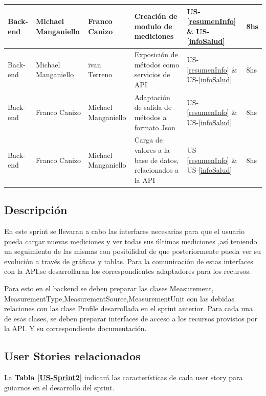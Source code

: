 {\begin{center}
{\begin{tabular}{|l|l|l|p{5cm}|l|p{1cm}|}
					Back-end& Michael Manganiello & Franco Canizo & Creación de modulo de mediciones&US-\ref{resumenInfo} \& US-\ref{infoSalud} &8hs\\ \hline
					Back-end& Michael Manganiello & ivan Terreno & Exposición de métodos como servicios de API 	& US-\ref{resumenInfo} \& US-\ref{infoSalud}&8hs\\ \hline
					Back-end& Franco Canizo & Michael Manganiello   & Adaptación de salida de métodos a formato Json&US-\ref{resumenInfo} \& US-\ref{infoSalud} &8hs\\ \hline
					Back-end & Franco Canizo & Michael Manganiello  & Carga de valores a la base de datos, relacionados a la API&US-\ref{resumenInfo} \& US-\ref{infoSalud} &8hs \\ \hline
				\end{tabular}
			}
		\end{center}
	}

    
\subsection{Descripción}
En este sprint se llevaran a cabo las interfaces necesarias para que el usuario pueda cargar nuevas mediciones y ver todas sus últimas mediciones ,así teniendo un seguimiento de las mismas con posibilidad de que posteriormente pueda ver su evolución a través de gráficas y tablas.
Para la comunicación de estas interfaces con la API,se desarrollaran los correspondientes adaptadores para los recursos.

Para esto en el backend se deben preparar las clases Measurement, MeasurementType,MeasurementSource,MeasurementUnit con las debidas relaciones con las clase Profile desarrollada en el sprint anterior.
Para cada una de esas clases, se deben preparar interfaces de acceso a los recursos provistos por la API. Y su correspondiente documentación.


\subsection{User Stories relacionados}
La \textbf{Tabla \ref{US-Sprint2}} indicará las características de cada user story para guiarnos en el desarrollo del sprint.

